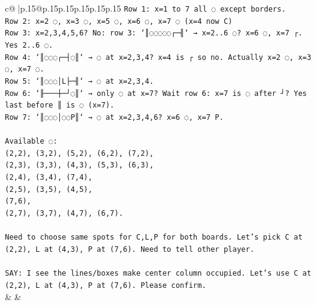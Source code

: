 \documentclass{article}
\begin{document}
{\begin{supertabular}{c@{$\;$}|p{.15\linewidth}@{}p{.15\linewidth}p{.15\linewidth}p{.15\linewidth}p{.15\linewidth}p{.15\linewidth}}
{{{\texttt{Row 1: x=1 to 7 all ◌ except borders.  } \\
\texttt{Row 2: x=2 ◌, x=3 ◌, x=5 ◌, x=6 ◌, x=7 ◌ (x=4 now C)  } \\
\texttt{Row 3: x=2,3,4,5,6? No: row 3: `║◌◌◌◌◌┌─╢` → x=2..6 ◌? x=6 ◌, x=7 ┌. Yes 2..6 ◌.  } \\
\texttt{Row 4: `║◌◌◌┌─┤◌║` → ◌ at x=2,3,4? x=4 is ┌ so no. Actually x=2 ◌, x=3 ◌, x=7 ◌.  } \\
\texttt{Row 5: `║◌◌◌│L├─╢` → ◌ at x=2,3,4.  } \\
\texttt{Row 6: `╟───┼─┘◌║` → only ◌ at x=7? Wait row 6: x=7 is ◌ after ┘? Yes last before ║ is ◌ (x=7).  } \\
\texttt{Row 7: `║◌◌◌│◌◌P║` → ◌ at x=2,3,4,6? x=6 ◌, x=7 P.} \\
\\ 
\texttt{Available ◌:  } \\
\texttt{(2,2), (3,2), (5,2), (6,2), (7,2),  } \\
\texttt{(2,3), (3,3), (4,3), (5,3), (6,3),  } \\
\texttt{(2,4), (3,4), (7,4),  } \\
\texttt{(2,5), (3,5), (4,5),  } \\
\texttt{(7,6),  } \\
\texttt{(2,7), (3,7), (4,7), (6,7).} \\
\\ 
\texttt{Need to choose same spots for C,L,P for both boards. Let’s pick C at (2,2), L at (4,3), P at (7,6). Need to tell other player.} \\
\\ 
\texttt{SAY: I see the lines/boxes make center column occupied. Let’s use C at (2,2), L at (4,3), P at (7,6). Please confirm.} \\
            }
        }
    }
    & & \\ \\


\end{supertabular}}
\end{document}

